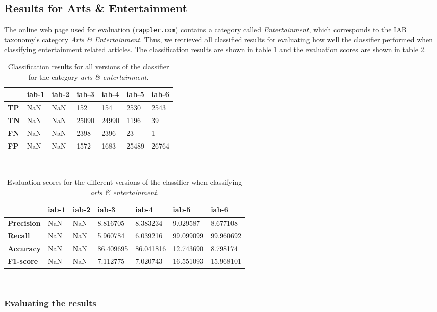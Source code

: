 \subsection{Results for Arts \& Entertainment}
The online web page used for evaluation (\texttt{rappler.com}) contains a category called \emph{Entertainment}, which corresponds to the IAB taxonomy's category \emph{Arts \& Entertainment}. Thus, we retrieved all classified results for evaluating how well the classifier performed when classifying entertainment related articles. The classification results are shown in table \ref{tab:iabresults_entertainment} and the evaluation scores are shown in table \ref{tab:precision_entertainment}.

\begin{table}[h]
\centering
\renewcommand{\arraystretch}{1.25}
\begin{tabularx}{\textwidth}{l|  X|X|X|X|X|X }
         & {\bf iab-1} & {\bf iab-2} & {\bf iab-3} & {\bf iab-4} & {\bf iab-5} & {\bf iab-6} \\ \hline
{\bf TP} & NaN          & NaN           & 152         & 154         & 2530        & 2543        \\ \hline
{\bf TN} & NaN          & NaN           & 25090       & 24990       & 1196        & 39          \\ \hline
{\bf FN} & NaN          & NaN           & 2398        & 2396        & 23          & 1           \\ \hline
{\bf FP} & NaN          & NaN           & 1572        & 1683        & 25489       & 26764       \\
\end{tabularx}
\\[10pt]
\caption[Classification results for \emph{arts \& entertainment}]{Classification results for all versions of the classifier for the category \emph{arts \& entertainment}.}
\label{tab:iabresults_entertainment}
\end{table}

\begin{table}[h]
\centering
\renewcommand{\arraystretch}{1.25}
\begin{tabularx}{\textwidth}{l|  X|X|X|X|X|X }
                & {\bf iab-1} & {\bf iab-2} & {\bf iab-3} & {\bf iab-4} & {\bf iab-5} & {\bf iab-6} \\ \hline
{\bf Precision} & NaN         & NaN         & 8.816705    & 8.383234    & 9.029587    & 8.677108    \\ \hline
{\bf Recall}    & NaN         & NaN         & 5.960784    & 6.039216    & 99.099099   & 99.960692   \\ \hline
{\bf Accuracy}  & NaN         & NaN         & 86.409695   & 86.041816   & 12.743690   & 8.798174    \\ \hline
{\bf F1-score}  & NaN         & NaN         & 7.112775    & 7.020743    & 16.551093   & 15.968101   \\
\end{tabularx}
\\[10pt]
\caption[Evaluation scores for \emph{arts \& entertainment}]{Evaluation scores for the different versions of the classifier when classifying \emph{arts \& entertainment}.}
\label{tab:precision_entertainment}
\end{table}

\subsubsection{Evaluating the results}


